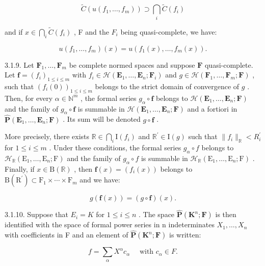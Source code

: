 \[
\tilde {C} (u (f _ {1}, \dots , f _ {m})) \supset \bigcap_ {i} \tilde {C} (f _ {i})
\]

and if \(x \in \bigcap_{i} \tilde{C}(f_i)\) , F and the \(F_i\) being quasi-complete, we have:

\[
u (f _ {1}, \dots , f _ {m}) (x) = u (f _ {1} (x), \dots , f _ {m} (x)).
\]

3.1.9. Let \(\mathbf{F}_1, \ldots, \mathbf{F}_m\) be complete normed spaces and suppose \(\mathbf{F}\) quasi-complete. Let \(\mathbf{f} = (f_i)_{1 \leqslant i \leqslant m}\) with \(f_i \in \mathcal{H}(\mathbf{E}_1, \ldots, \mathbf{E}_n; \mathbf{F}_i)\) and \(g \in \mathcal{H}(\mathbf{F}_1, \ldots, \mathbf{F}_m; \mathbf{F})\) , such that \((f_i(0))_{1 \leqslant i \leqslant m}\) belongs to the strict domain of convergence of \(g\) . Then, for every \(\alpha \in \mathbb{N}^m\) , the formal series \(g_\alpha \circ \mathbf{f}\) belongs to \(\mathcal{H}(\mathbf{E}_1, \ldots, \mathbf{E}_n; \mathbf{F})\) and the family of \(g_\alpha \circ \mathbf{f}\) is summable in \(\mathcal{H}(\mathbf{E}_1, \ldots, \mathbf{E}_n; \mathbf{F})\) and a fortiori in \(\hat{\mathbf{P}}(\mathbf{E}_1, \ldots, \mathbf{E}_n; \mathbf{F})\) . Its sum will be denoted \(g \circ \mathbf{f}\) .

More precisely, there exists \(\mathbb{R}\in\bigcap_{i}\mathrm{I}(f_{i})\) and \(\mathbb{R}^{\prime}\in\mathrm{I}(g)\) such that \(\|f_{i}\|_{\mathbb{R}}<R_{i}^{\prime}\) for \(1\leqslant i\leqslant m\) . Under these conditions, the formal series \(g_{\alpha}\circ f\) belongs to \(\mathcal{H}_{\mathbb{R}}(\mathrm{E}_{1},\ldots,\mathrm{E}_{n};\mathrm{F})\) and the family of \(g_{\alpha}\circ f\) is summable in \(\mathcal{H}_{\mathbb{R}}(\mathrm{E}_{1},\ldots,\mathrm{E}_{n};\mathrm{F})\) . Finally, if \(x\in\mathrm{B}(\mathbb{R})\) , then \(\mathbf{f}(x)=(f_{i}(x))\) belongs to \(\mathrm{B}(\mathrm{R}^{\prime})\subset\mathrm{F}_{1}\times\cdots\times\mathrm{F}_{m}\) and we have:

\[
g (\mathbf {f} (x)) = (g \circ \mathbf {f}) (x).
\]

3.1.10. Suppose that \(E_{i} = K\) for \(1 \leqslant i \leqslant n\) . The space \(\hat{\mathbf{P}}(\mathbf{K}^{n}; \mathbf{F})\) is then identified with the space of formal power series in n indeterminates \(X_{1}, \ldots, X_{n}\) with coefficients in F and an element of \(\hat{\mathbf{P}}(\mathbf{K}^{n};\mathbf{F})\) is written:

\[
f = \sum_ {\alpha} X ^ {\alpha} c _ {\alpha} \quad \text {   with   } c _ {\alpha} \in F.
\]

